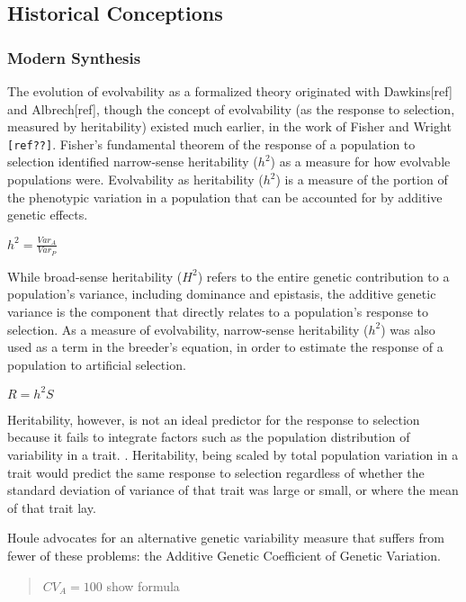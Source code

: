 \subsection{Historical Conceptions}
\subsubsection{Modern Synthesis}

The evolution of evolvability as a formalized theory originated with Dawkins[ref] and Albrech[ref], though the concept of evolvability (as the response to selection, measured by heritability) existed much earlier, in the work of Fisher\cite{fisher_genetical_1930}  and Wright \verb|[ref??]|.  Fisher’s fundamental theorem of the response of a population to selection identified narrow-sense heritability ($h^2$) as a measure for how evolvable populations were. Evolvability as heritability ($h^2$) is a measure of the portion of the phenotypic variation in a population that can be accounted for by additive genetic effects.

$h^2 = \frac{Var_A}{Var_P}$

While broad-sense heritability ($H^2$) refers to the entire genetic contribution to a population’s variance, including dominance and epistasis, the additive genetic variance is the component that directly relates to a population’s response to selection.\cite{houle_comparing_1992} As a measure of evolvability, narrow-sense heritability ($h^2$) was also used as a term in the breeder’s equation, in order to estimate the response of a population to artificial selection.

$R = {h^2}S$

Heritability, however, is not an ideal predictor for the response to selection because it fails to integrate factors such as the population distribution of variability in a trait. \cite{hansen_heritability_2011}. Heritability, being scaled by total population variation in a trait would predict the same response to selection regardless of whether the standard deviation of variance of that trait was large or small, or where the mean of that trait lay.

Houle advocates for an alternative genetic variability measure that suffers from fewer of these problems: the Additive Genetic Coefficient of Genetic Variation.

\begin{quote}
$CV_A = 100$
show formula
\end{quote}

